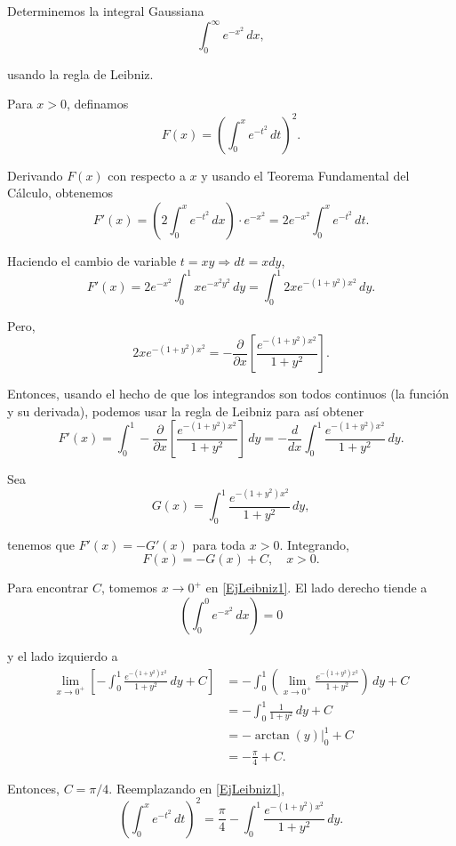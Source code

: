 \begin{ejemplo}
    Determinemos la integral Gaussiana
    $$\int_0^{\infty} e^{-x^2} \,dx,$$

    usando la regla de Leibniz. 

    Para $x > 0$, definamos
    $$F(x) = \left( \int_0^x e^{-t^2} \,dt \right)^2.$$

    Derivando $F(x)$ con respecto a $x$ y usando el Teorema Fundamental del Cálculo, obtenemos 
    $$F'(x) = \left(2 \int_0^x e^{-t^2} \,dx \right) \cdot e^{-x^2} = 2 e^{-x^2} \int_0^x e^{-t^2} \,dt.$$

    Haciendo el cambio de variable $t = xy \Rightarrow dt = x dy$, 
    $$F'(x) = 2 e^{-x^2} \int_0^1 x e^{-x^2y^2} \,dy = \int_0^1 2 x e^{-(1+y^2)x^2} \,dy.$$

    Pero,
    $$2 x e^{-(1+y^2)x^2} = - \frac{\partial}{\partial x}\left[ \frac{e^{-(1+y^2)x^2}}{1+y^2} \right].$$

    Entonces, usando el hecho de que los integrandos son todos continuos (la función y su derivada), podemos usar la regla de Leibniz para así obtener
    $$F'(x) = \int_0^1 - \frac{\partial}{\partial x}\left[ \frac{e^{-(1+y^2)x^2}}{1+y^2} \right] \,dy = - \frac{d}{dx} \int_0^1  \frac{e^{-(1+y^2)x^2}}{1+y^2} \,dy.$$

    Sea
    $$G(x) =\int_0^1  \frac{e^{-(1+y^2)x^2}}{1+y^2} \,dy,$$

    tenemos que $F'(x) = - G'(x)$ para toda $x > 0$. Integrando,
    \begin{equation}
        F(x) = - G(x) + C, \quad x > 0. \label{EjLeibniz1}
    \end{equation}

    Para encontrar $C$, tomemos $x \to 0^+$ en \eqref{EjLeibniz1}. El lado derecho tiende a
    $$\left( \int_0^0 e^{-x^2} \,dx\right) = 0$$

    y el lado izquierdo a
    \begin{align*}
       \lim_{x \to 0^+} \left[ - \int_0^1  \frac{e^{-(1+y^2)x^2}}{1+y^2} \,dy + C\right] &= - \int_0^1 \left(\lim_{x \to 0^+} \frac{e^{-(1+y^2)x^2}}{1+y^2}   \right) \,dy + C \\
       &= - \int_0^1 \frac{1}{1+y^2} \,dy + C \\
       &= \left. - \arctan(y) \right|_0^1 + C\\
       &= - \frac{\pi}{4} + C.
    \end{align*}

    Entonces, $C = \pi/4$. Reemplazando en \eqref{EjLeibniz1},
    $$\left( \int_0^x e^{-t^2} \,dt \right)^2 = \frac{\pi}{4}- \int_0^1  \frac{e^{-(1+y^2)x^2}}{1+y^2} \,dy .$$
    

\end{ejemplo}
